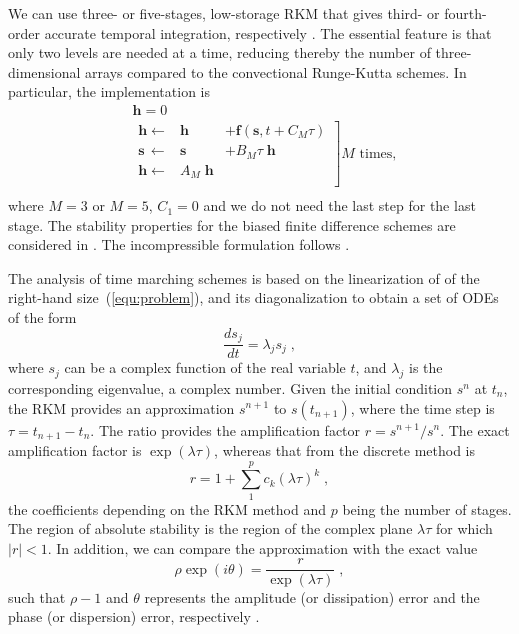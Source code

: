 {We can use three- or five-stages, low-storage RKM that gives third- or fourth-order accurate temporal integration, respectively \citep{Williamson:1980,Carpenter:1994}. The essential feature is that only two levels are needed at a time, reducing thereby the number of three-dimensional arrays compared to the convectional Runge-Kutta schemes. In particular, the implementation is
\begin{align*}
  &\mathbf{h} = 0 \\
  &\left.
  \begin{array}{rrl}
    \mathbf{h} \leftarrow   & \mathbf{h} &+ \mathbf{f}(\mathbf{s},t+C_M\tau) \\
    \mathbf{s}\, \leftarrow & \mathbf{s} &+ B_M\tau\;\mathbf{h}       \\
    \mathbf{h} \leftarrow   &A_M\; \mathbf{h}& \\
  \end{array}
  \right] M \textrm{ times},\\
\end{align*}
where $M=3$ or $M=5$, $C_1=0$ and we do not need the last step for the last stage.  The stability properties for the biased finite difference schemes are considered in \cite{Carpenter:1993}. The incompressible formulation follows \cite{Wilson:1998}.

The analysis of time marching schemes is based on the linearization of of the right-hand size~(\ref{equ:problem}), and its diagonalization to obtain a set of ODEs of the form
\begin{equation}
  \frac{ds_j}{dt}=\lambda_j s_j \;,
\end{equation}
where $s_j$ can be a complex function of the real variable $t$, and $\lambda_j$ is the corresponding eigenvalue, a complex number. Given the initial condition $s^n$ at $t_n$, the RKM provides an approximation $s^{n+1}$ to $s(t_{n+1})$, where the time step is $\tau=t_{n+1}-t_n$. The ratio provides the amplification factor $r=s^{n+1}/s^n$. The exact amplification factor is $\exp(\lambda \tau)$, whereas that from the discrete method is
\begin{equation}
  r=1+\sum_1^pc_k(\lambda \tau)^k\;,
\end{equation}
the coefficients depending on the RKM method and $p$ being the number of stages. The region of absolute stability is the region of the complex plane $\lambda\tau$ for which $|r|<1$. In addition, we can compare the approximation with the exact value
\begin{equation}
  \rho\exp(i\theta)=\frac{r}{\exp(\lambda\tau)}\;,
  \label{equ:rkmerror}
\end{equation}
such that $\rho-1$ and $\theta$ represents the amplitude (or dissipation) error and the phase (or dispersion) error, respectively \citep{Hu:1996}.

}
